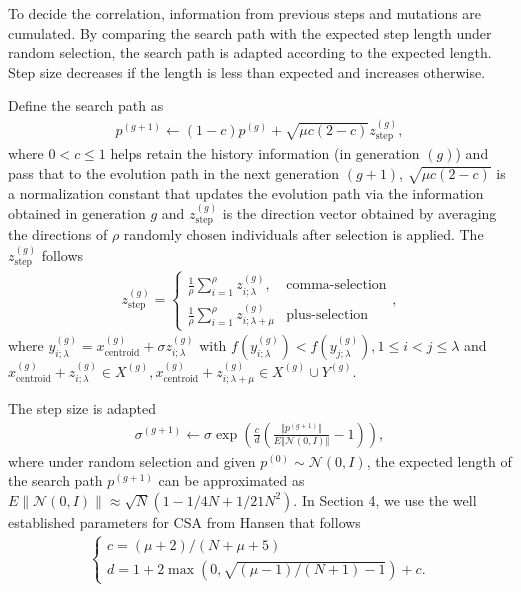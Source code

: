To decide the correlation, information from previous steps and mutations are cumulated. By comparing the search path with the expected step length under random selection, the search path is adapted according to the expected length. Step size decreases if the length is less than expected and increases otherwise. 

Define the search path as 
\begin{align}
p^{(g+1)} \leftarrow (1-c)p^{(g)} + \sqrt{\mu c (2-c)} z_{\text{step}}^{(g)},
\end{align}
where $0<c \leq 1$ helps retain the history information (in generation $(g)$) and pass that to the evolution path in the next generation $(g+1)$, $ \sqrt{\mu c (2-c)}$ is a normalization constant that updates the evolution path via the information obtained in generation $g$ and $z_{\text{step}}^{(g)}$ is the direction vector obtained by averaging the directions of $\rho$ randomly chosen individuals after selection is applied. The $z_{\text{step}}^{(g)}$ follows
\begin{align}
z_{\text{step}}^{(g)} = 
\begin{cases}
 \frac{1}{\rho} \sum_{i=1}^\rho z_{i;\lambda}^{(g)},& \text{comma-selection}\\
\frac{1}{\rho} \sum_{i=1}^\rho z_{i;\lambda+\mu}^{(g)} & \text{plus-selection}
\end{cases},
\end{align}
where $y_{i;\lambda}^{(g)} = x_{\text{centroid}}^{(g)} +\sigma z_{i;\lambda}^{(g)}$ with $f(y_{i;\lambda}^{(g)} )< f(y_{j;\lambda}^{(g)}), 1 \leq i < j \leq \lambda$ and $x_{\text{centroid}}^{(g)} + z_{i;\lambda}^{(g)} \in X^{(g)},x_{\text{centroid}}^{(g)} + z_{i;\lambda+\mu}^{(g)} \in X^{(g)} \cup Y^{(g)} $. 

The step size is adapted 
\begin{align}
\sigma^{(g+1)} \leftarrow \sigma \exp \left (  \frac{c}{d}  \left( \frac{\Vert p^{(g+1)}\Vert}{E \Vert \mathcal{N}(0,I)\Vert } -1 \right) \right ),
\end{align}
where under random selection and given $p^{(0)}\sim \mathcal{N}(0,I)$, the expected length of the search path $p^{(g+1)}$ can be approximated as $E\| \mathcal{N}(0,I) \| \approx \sqrt{N} (1-1/4N + 1/21N^2)$. In Section 4, we use the well established parameters for CSA from  Hansen \cite{hansen2016cma} that follows 
\begin{align}
\begin{cases}
c = (\mu+2)/(N+\mu+5)\\
d=1+2 \max\left (0, \sqrt{(\mu-1)/(N+1)-1} \right)+c.
\end{cases}
\end{align}


